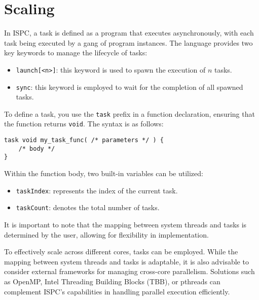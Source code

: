 \section{Scaling}

In ISPC, a task is defined as a program that executes asynchronously, with each task being executed by a gang of program instances. 
The language provides two key keywords to manage the lifecycle of tasks:
\begin{itemize}
    \item \texttt{launch[<n>]}: this keyword is used to spawn the execution of $n$ tasks.
    \item \texttt{sync}: this keyword is employed to wait for the completion of all spawned tasks.
\end{itemize}
To define a task, you use the \texttt{task} prefix in a function declaration, ensuring that the function returns \texttt{void}. 
The syntax is as follows:
\begin{lstlisting}[style=ISPC]
task void my_task_func( /* parameters */ ) {
    /* body */ 
}
\end{lstlisting}
Within the function body, two built-in variables can be utilized:
\begin{itemize}
    \item \texttt{taskIndex}: represents the index of the current task.
    \item \texttt{taskCount}: denotes the total number of tasks.
\end{itemize}
It is important to note that the mapping between system threads and tasks is determined by the user, allowing for flexibility in implementation.

To effectively scale across different cores, tasks can be employed. 
While the mapping between system threads and tasks is adaptable, it is also advisable to consider external frameworks for managing cross-core parallelism. 
Solutions such as OpenMP, Intel Threading Building Blocks (TBB), or pthreads can complement ISPC's capabilities in handling parallel execution efficiently.